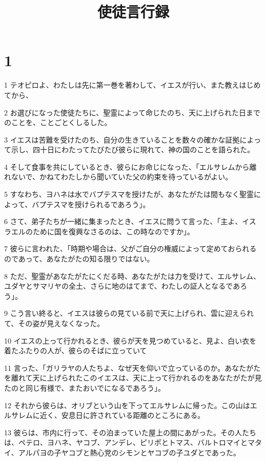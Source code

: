 

\title{使徒言行録}


\chapter{1}

\par 1 テオピロよ、わたしは先に第一巻を著わして、イエスが行い、また教えはじめてから、
\par 2 お選びになった使徒たちに、聖霊によって命じたのち、天に上げられた日までのことを、ことごとくしるした。
\par 3 イエスは苦難を受けたのち、自分の生きていることを数々の確かな証拠によって示し、四十日にわたってたびたび彼らに現れて、神の国のことを語られた。
\par 4 そして食事を共にしているとき、彼らにお命じになった、「エルサレムから離れないで、かねてわたしから聞いていた父の約束を待っているがよい。
\par 5 すなわち、ヨハネは水でバプテスマを授けたが、あなたがたは間もなく聖霊によって、バプテスマを授けられるであろう」。
\par 6 さて、弟子たちが一緒に集まったとき、イエスに問うて言った、「主よ、イスラエルのために国を復興なさるのは、この時なのですか」。
\par 7 彼らに言われた、「時期や場合は、父がご自分の権威によって定めておられるのであって、あなたがたの知る限りではない。
\par 8 ただ、聖霊があなたがたにくだる時、あなたがたは力を受けて、エルサレム、ユダヤとサマリヤの全土、さらに地のはてまで、わたしの証人となるであろう」。
\par 9 こう言い終ると、イエスは彼らの見ている前で天に上げられ、雲に迎えられて、その姿が見えなくなった。
\par 10 イエスの上って行かれるとき、彼らが天を見つめていると、見よ、白い衣を着たふたりの人が、彼らのそばに立っていて
\par 11 言った、「ガリラヤの人たちよ、なぜ天を仰いで立っているのか。あなたがたを離れて天に上げられたこのイエスは、天に上って行かれるのをあなたがたが見たのと同じ有様で、またおいでになるであろう」。
\par 12 それから彼らは、オリブという山を下ってエルサレムに帰った。この山はエルサレムに近く、安息日に許されている距離のところにある。
\par 13 彼らは、市内に行って、その泊まっていた屋上の間にあがった。その人たちは、ペテロ、ヨハネ、ヤコブ、アンデレ、ピリポとトマス、バルトロマイとマタイ、アルパヨの子ヤコブと熱心党のシモンとヤコブの子ユダとであった。

